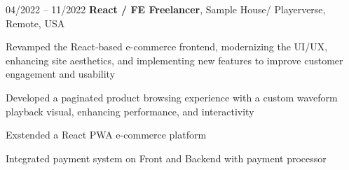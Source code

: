 

\begin{twocolentry}{
    04/2022 – 11/2022
}
\textbf{React / FE Freelancer}, Sample House/ Playerverse, Remote, USA\end{twocolentry}

\vspace{0.10 cm}
\begin{onecolentry}
   \begin{highlights}
       \item Revamped the React-based e-commerce frontend, modernizing the UI/UX, enhancing site aesthetics, and implementing new features to improve customer engagement and usability
       \item Developed a paginated product browsing experience with a custom waveform playback visual, enhancing performance, and interactivity
       \item Exstended a React PWA e-commerce platform
       \item Integrated payment system on Front and Backend with payment processor 
   \end{highlights}
\end{onecolentry}
